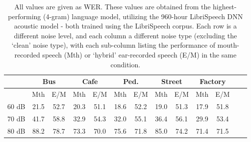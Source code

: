 \begin{table}[h]
\begin{center}
\begin{tabular}{| c || c | c | c | c | c | c | c | c | c | c | c | c |} \hline
      & \multicolumn{2}{|c|}{Bus} & \multicolumn{2}{|c|}{Cafe} & \multicolumn{2}{|c|}{Ped.} & \multicolumn{2}{|c|}{Street} & \multicolumn{2}{|c|}{Factory} \\ \hline
      & Mth & E/M & Mth & E/M & Mth & E/M & Mth & E/M & Mth & E/M \\ \hline\hline
60 dB & 21.5 & 52.7 & 20.3 & 51.1 & 18.6 & 52.2 & 19.0 & 51.3 & 17.9 & 51.8  \\ \hline
70 dB & 41.7 & 58.8 & 32.9 & 54.3 & 32.0 & 55.1 & 36.4 & 56.1 & 29.9 & 53.4  \\ \hline
80 dB & 88.2 & 78.7 & 73.3 & 70.0 & 75.6 & 71.8 & 85.0 & 74.2 & 71.4 & 71.5  \\ \hline
\end{tabular}
\end{center}
\caption{All values are given as WER. These values are obtained from the highest-performing (4-gram) language model, utilizing the 960-hour LibriSpeech DNN acoustic model - both trained using the LibriSpeech corpus.  Each row is a different noise level, and each column a different noise type (excluding the `clean' noise type), with each sub-column listing the performance of mouth-recorded speech (Mth) or `hybrid' ear-recorded speech (E/M) in the same condition.}\label{tab:hybrid-wers}
\end{table}

